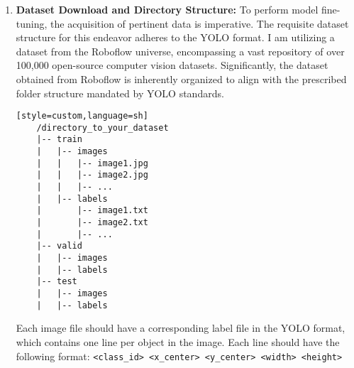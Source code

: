 \begin{enumerate}
\begin{lstlisting}[language=Python, caption=importing models from the supergradients][H]
    MODEL_ARCH_OPTIONS = ['yolo_nas_l', 'yolo_nas_m', 'yolo_nas_s']
    
    # Display options to the user
    print("Choose a model architecture:")
    for i, MODEL_ARCH in enumerate(MODEL_ARCH_OPTIONS, start=1):
        print(f"{i}. {MODEL_ARCH}")
    
    # Take input from the user
    while True:
        try:
            user_input = int(input("Enter your choice number: "))
            if 1 <= user_input <= len(MODEL_ARCH_OPTIONS):
                selected_model_arch = MODEL_ARCH_OPTIONS[user_input - 1]
                print(f"Selected Model Architecture: {selected_model_arch}")
                break
            else:
                print("Invalid input. Please enter a valid number.")
        except ValueError:
            print("Invalid input. Please enter a valid number.")
    




    \end{lstlisting}
    \item \textbf{Dataset Download and Directory Structure: }
   To perform model fine-tuning, the acquisition of pertinent data is imperative. The requisite dataset structure for this endeavor adheres to the YOLO format. I am utilizing a dataset from the Roboflow universe, encompassing a vast repository of over 100,000 open-source computer vision datasets. Significantly, the dataset obtained from Roboflow is inherently organized to align with the prescribed folder structure mandated by YOLO standards.

    \begin{lstlisting}[caption=Dataset folder structure YOLO format][style=custom,language=sh]
    /directory_to_your_dataset
    |-- train
    |   |-- images
    |   |   |-- image1.jpg
    |   |   |-- image2.jpg
    |   |   |-- ...
    |   |-- labels
    |       |-- image1.txt
    |       |-- image2.txt
    |       |-- ...
    |-- valid
    |   |-- images
    |   |-- labels
    |-- test
    |   |-- images
    |   |-- labels
    \end{lstlisting}
    Each image file should have a corresponding label file in the YOLO format, which contains one line per object in the image. Each line should have the following format:
    \texttt{<class\_id> <x\_center> <y\_center> <width> <height>}
    

\end{enumerate}
